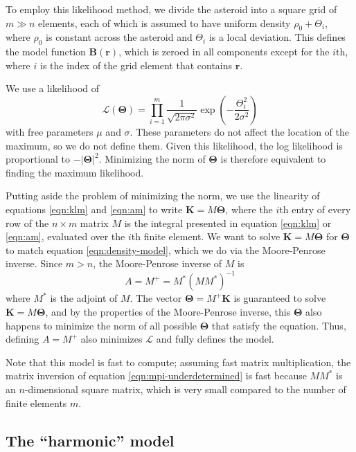 \documentclass[fleqn,usenatbib]{mnras}
\newcommand{\parens}[1]{\left( #1 \right)}
\begin{document}
To employ this likelihood method, we divide the asteroid into a square grid of $m \gg n$ elements, each of which is assumed to have uniform density $\rho_0+\Theta_i$, where $\rho_0$ is constant across the asteroid and $\Theta_i$ is a local deviation. This defines the model function $\bm B(\bm r)$, which is zeroed in all components except for the $i$th, where $i$ is the index of the grid element that contains $\bm r$.

We use a likelihood of 
\begin{equation}
  \mathcal{L}(\bm \Theta) = \prod_{i=1}^m \frac{1}{\sqrt{2\pi \sigma^2}} \exp\parens{-\frac{\Theta_i^2}{2 \sigma^2}}
\end{equation}
with free parameters $\mu$ and $\sigma$. These parameters do not affect the location of the maximum, so we do not define them. Given this likelihood, the log likelihood is proportional to $-|\bm \Theta|^2$. Minimizing the norm of $\bm \Theta$ is therefore equivalent to finding the maximum likelihood.

Putting aside the problem of minimizing the norm, we use the linearity of equations \ref{eqn:klm} and \ref{eqn:am} to write $\bm K = M \bm \Theta$, where the $i$th entry of every row of the $n\times m$ matrix $M$ is the integral presented in equation \ref{eqn:klm} or \ref{eqn:am}, evaluated over the $i$th finite element. We want to solve $\bm K = M \bm \Theta$ for $\bm \Theta$ to match equation \ref{eqn:density-model}, which we do via the Moore-Penrose inverse. Since $m>n$, the Moore-Penrose inverse of $M$ is
\begin{equation}
  A=M^+ = M^*(MM^*)^{-1}
  \label{eqn:mpi-underdetermined}
\end{equation}
where $M^*$ is the adjoint of $M$. The vector $\bm \Theta=M^+\bm K$ is guaranteed to solve $\bm K = M \bm \Theta$, and by the properties of the Moore-Penrose inverse, this $\bm \Theta$ also happens to minimize the norm of all possible $\bm \Theta$ that satisfy the equation. Thus, defining $A=M^+$ also minimizes $\mathcal{L}$ and fully defines the model.

Note that this model is fast to compute; assuming fast matrix multiplication, the matrix inversion of equation \ref{eqn:mpi-underdetermined} is fast because $MM^*$ is an $n$-dimensional square matrix, which is very small compared to the number of finite elements $m$.




\subsection{The ``harmonic'' model}
\label{sec:harmonic}
\end{document}
